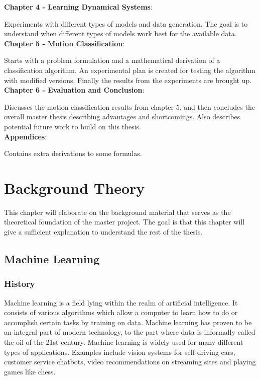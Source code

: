 \documentclass[12pt,a4paper]{book}
\begin{document}
\noindent \textbf{Chapter 4 - Learning Dynamical Systems}:

Experiments with different types of models and data generation. The goal is to understand when different types of models work best for the available data. \\

\noindent \textbf{Chapter 5 - Motion Classification}:

Starts with a problem formulation and a mathematical derivation of a classification algorithm. An experimental plan is created for testing the algorithm with modified versions. Finally the results from the experiments are brought up. \\

\noindent \textbf{Chapter 6 - Evaluation and Conclusion}:

Discusses the motion classification results from chapter 5, and then concludes the overall master thesis describing advantages and shortcomings. Also describes potential future work to build on this thesis. \\

\noindent \textbf{Appendices}:

Contains extra derivations to some formulas. \\

\chapter{Background Theory}\label{T-B}
\label{cha:TheoryAndBackground}

This chapter will elaborate on the background material that serves as the theoretical foundation of the master project. The goal is that this chapter will give a sufficient explanation to understand the rest of the thesis.

\section{Machine Learning}

\subsection{History}



Machine learning is a field lying within the realm of artificial intelligence. It consists of various algorithms which allow a computer to learn how to do or accomplish certain tasks by training on data. Machine learning has proven to be an integral part of modern technology, to the part where data is informally called the oil of the 21st century. Machine learning is widely used for many different types of applications. Examples include vision systems for self-driving cars, customer service chatbots, video recommendations on streaming sites and playing games like chess.
\end{document}
